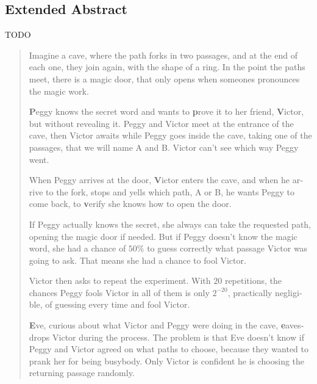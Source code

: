 
\begingroup
\let\clearpage\relax
\let\cleardoublepage\relax
\let\cleardoublepage\relax

\begin{otherlanguage}{english}
\chapter*{Extended Abstract}

TODO



\hfil

\begin{quote}
	Imagine a cave, where the path forks in two passages, and at the end of each one, they join again, with the shape of a ring. In the point the paths meet, there is a magic door, that only opens when someones pronounces the magic work.
	
	\textbf{P}eggy knows the secret word and wants to \textbf{p}rove it to her friend, \textbf{V}ictor, but without revealing it.
	Peggy and Victor meet at the entrance of the cave, then Victor awaits while Peggy goes inside the cave, taking one of the passages, that we will name A and B. Victor can't see which way Peggy went. 
	
	When Peggy arrives at the door, \textbf{V}ictor enters the cave, and when he arrive to the fork, stops and yells which path, A or B, he wants Peggy to come back, to \textbf{v}erify she knows how to open the door.
		
	If Peggy actually knows the secret, she always can take the requested path, opening the magic door if needed.
	But if Peggy doesn't know the magic word, she had a chance of $50\%$ to guess correctly what passage Victor was going to ask. That means she had a chance to fool Victor.
	
	Victor then asks to repeat the experiment. With $20$ repetitions, the chances Peggy fools Victor in all of them is only  $2^{-20}$, practically negligible, of guessing every time and fool Victor.
	
	\textbf{E}ve, curious about what Victor and Peggy were doing in the cave, \textbf{e}avesdrops Victor during the process. The problem is that Eve doesn't know if Peggy and Victor agreed on what paths to choose, because they wanted to prank her for being busybody. Only Victor is confident he is choosing the returning passage randomly.
	

\end{quote}
\end{otherlanguage}
